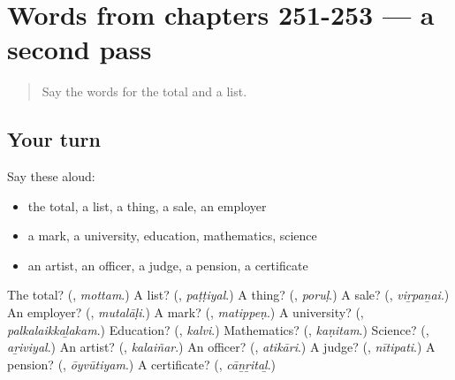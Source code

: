 \section[(dialogue)]{Words from chapters 251-253 — a second pass}

\label{lesson:TA-R253-second-pass-words-from-chapters-251-253}



\begin{quote}
Say the words for the total and a list.
\end{quote}

\subsection*{Your turn}
Say these aloud:

\begin{itemize}
\raggedright
  \item the total, a list, a thing, a sale, an employer
  \item a mark, a university, education, mathematics, science
  \item an artist, an officer, a judge, a pension, a certificate
\end{itemize}

\begin{tcolorbox}[breakable,colback=teal!4,colframe=teal!35!black,title={Before you move on}]
The total? (\textbf{}, \emph{mottam}.) A list? (\textbf{}, \emph{paṭṭiyal}.) A thing? (\textbf{}, \emph{poruḷ}.) A sale? (\textbf{}, \emph{viṟpaṉai}.) An employer? (\textbf{}, \emph{mutalāḷi}.) A mark? (\textbf{}, \emph{matippeṇ}.) A university? (\textbf{}, \emph{palkalaikkaḻakam}.) Education? (\textbf{}, \emph{kalvi}.) Mathematics? (\textbf{}, \emph{kaṇitam}.) Science? (\textbf{}, \emph{aṟiviyal}.) An artist? (\textbf{}, \emph{kalaiñar}.) An officer? (\textbf{}, \emph{atikāri}.) A judge? (\textbf{}, \emph{nītipati}.) A pension? (\textbf{}, \emph{ōyvūtiyam}.) A certificate? (\textbf{}, \emph{cāṉṟitaḻ}.)
\end{tcolorbox}
